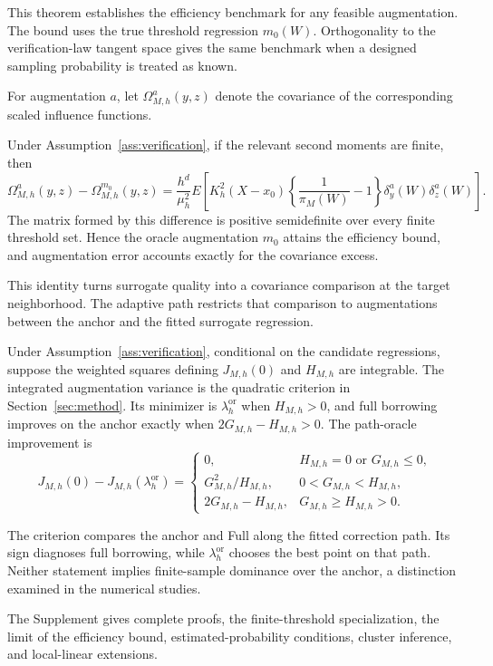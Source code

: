 This theorem establishes the efficiency benchmark for any feasible
augmentation. The bound uses the true threshold regression \(m_0(W)\).
Orthogonality to the verification-law tangent space gives the same benchmark
when a designed sampling probability is treated as known.

For augmentation \(a\), let \(\Omega_{M,h}^{a}(y,z)\) denote the covariance of
the corresponding scaled influence functions.

\begin{corollary}
\label{cor:cov-order}
Under Assumption~\ref{ass:verification}, if the relevant second moments are
finite, then
\begin{equation}
\Omega_{M,h}^{a}(y,z)-\Omega_{M,h}^{m_0}(y,z)
=
\frac{h^d}{\mu_h^2}
E\left[
K_h^2(X-x_0)
\left\{\frac1{\pi_M(W)}-1\right\}
\delta_y^a(W)\delta_z^a(W)
\right].
\label{eq:psd}
\end{equation}
The matrix formed by this difference is positive semidefinite over every finite
threshold set. Hence the oracle augmentation \(m_0\) attains the efficiency
bound, and augmentation error accounts exactly for the covariance excess.
\end{corollary}

This identity turns surrogate quality into a covariance comparison at the
target neighborhood. The adaptive path restricts that comparison to
augmentations between the anchor and the fitted surrogate regression.

\begin{theorem}
\label{thm:transfer}
Under Assumption~\ref{ass:verification}, conditional on the candidate
regressions, suppose the weighted squares defining \(J_{M,h}(0)\) and
\(H_{M,h}\) are integrable. The integrated augmentation variance is the
quadratic criterion in Section~\ref{sec:method}. Its minimizer is
\(\lambda_h^{\mathrm{or}}\) when \(H_{M,h}>0\), and full borrowing improves on
the anchor exactly when \(2G_{M,h}-H_{M,h}>0\). The path-oracle improvement is
\begin{equation}
J_{M,h}(0)-J_{M,h}(\lambda_h^{\mathrm{or}})
=
\begin{cases}
0, & H_{M,h}=0\text{ or }G_{M,h}\le0,\\[2pt]
G_{M,h}^2/H_{M,h}, & 0<G_{M,h}<H_{M,h},\\[2pt]
2G_{M,h}-H_{M,h}, & G_{M,h}\ge H_{M,h}>0.
\end{cases}
\label{eq:oracle-gain}
\end{equation}
\end{theorem}

The criterion compares the anchor and Full along the fitted correction path.
Its sign diagnoses full borrowing, while \(\lambda_h^{\mathrm{or}}\) chooses the
best point on that path. Neither statement implies finite-sample dominance over
the anchor, a distinction examined in the numerical studies.

The Supplement gives complete proofs, the finite-threshold specialization, the
limit of the efficiency bound, estimated-probability conditions, cluster
inference, and local-linear extensions.
